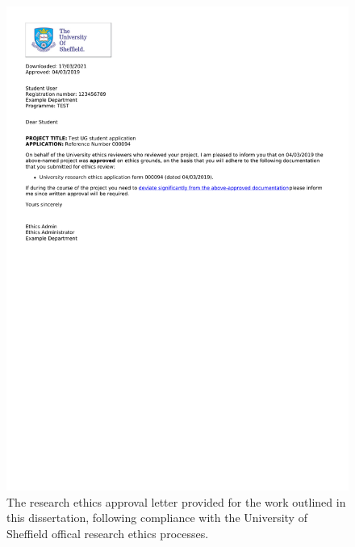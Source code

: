 \begin{figure}
\includegraphics[width=15cm,clip, trim=1cm 15cm 1cm 1cm]{ApprovalLetter.pdf}
\caption{The research ethics approval letter provided for the work outlined in this dissertation, following compliance with the University of Sheffield offical research ethics processes.}
\label{ethicsapprov}
\end{figure}
